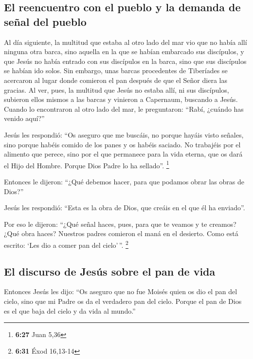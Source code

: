 \begin{paracol}{2}
\hypertarget{el-reencuentro-con-el-pueblo-y-la-demanda-de-seuxf1al-del-pueblo}{%
\subsection{El reencuentro con el pueblo y la demanda de señal del
pueblo}\label{el-reencuentro-con-el-pueblo-y-la-demanda-de-seuxf1al-del-pueblo}}

 Al día siguiente, la multitud que estaba al otro lado
del mar vio que no había allí ninguna otra barca, sino aquella en la que
se habían embarcado sus discípulos, y que Jesús no había entrado con sus
discípulos en la barca, sino que sus discípulos se habían ido solos.
 Sin embargo, unas barcas procedentes de Tiberíades se
acercaron al lugar donde comieron el pan después de que el Señor diera
las gracias.  Al ver, pues, la multitud que Jesús no
estaba allí, ni sus discípulos, subieron ellos mismos a las barcas y
vinieron a Capernaum, buscando a Jesús.  Cuando lo
encontraron al otro lado del mar, le preguntaron: ``Rabí, ¿cuándo has
venido aquí?''

 Jesús les respondió: ``Os aseguro que me buscáis, no
porque hayáis visto señales, sino porque habéis comido de los panes y os
habéis saciado.  No trabajéis por el alimento que perece,
sino por el que permanece para la vida eterna, que os dará el Hijo del
Hombre. Porque Dios Padre lo ha sellado''. \footnote{\textbf{6:27} Juan
  5,36}

 Entonces le dijeron: ``¿Qué debemos hacer, para que
podamos obrar las obras de Dios?''

 Jesús les respondió: ``Esta es la obra de Dios, que
creáis en el que él ha enviado''.

 Por eso le dijeron: ``¿Qué señal haces, pues, para que
te veamos y te creamos? ¿Qué obra haces?  Nuestros padres
comieron el maná en el desierto. Como está escrito: `Les dio a comer pan
del cielo'\,''. \footnote{\textbf{6:31} Éxod 16,13-14}

\hypertarget{el-discurso-de-jesuxfas-sobre-el-pan-de-vida}{%
\subsection{El discurso de Jesús sobre el pan de
vida}\label{el-discurso-de-jesuxfas-sobre-el-pan-de-vida}}

 Entonces Jesús les dijo: ``Os aseguro que no fue Moisés
quien os dio el pan del cielo, sino que mi Padre os da el verdadero pan
del cielo.  Porque el pan de Dios es el que baja del
cielo y da vida al mundo.''


\end{paracol}

